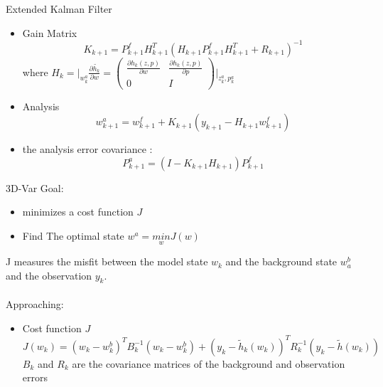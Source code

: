 \documentclass{beamer}
\begin{document}
\begin{frame}{Extended Kalman Filter}
    \begin{itemize}
        \item Gain Matrix 
        \begin{equation}
        K_{k+1} = P_{k+1}^f H_{k+1}^T (H_{k+1} P_{k+1}^f H_{k+1}^T + R_{k+1}) ^{-1}
        \end{equation}
        where  $H_k = \big|_{w_k^a} \frac{\partial \tilde{h_k} }{ \partial w } = 
        \begin{pmatrix}
        \frac{\partial h_k(z,p)}{\partial w } & \frac{\partial h_k(z,p)}{ \partial p}\\
        0 & I 
        \end{pmatrix}  \big|_{{z_k^a},{ p_k^a}}$
        
        \item Analysis
        \begin{equation}
        w_{k+1}^a = w_{k+1}^f + K_{k+1} (y_{k+1} - H_{k+1} w_{k+1}^f)
        \end{equation}


        \item the analysis error covariance :
        \begin{equation}
            P_{k+1}^a = (I - K_{k+1} H_{k+1} ) P_{k+1}^f
        \end{equation}
    \end{itemize}
\end{frame}
\begin{frame}{3D-Var}
Goal:  
\begin{itemize}
    \item minimizes a cost function $J$  
    \item Find The optimal state $w^a = \underset{w} {min} J(w)$ 
\end{itemize}
    J measures the misfit between the model state $w_k$ and the background state $w_a^b$ and the observation $y_k$. \\ 
~~\\
    
Approaching: 
\begin{itemize}
        \item Cost function $J$
        \begin{equation}
        J(w_k) = (w_k - w_k^b)^T B_k^{-1} (w_k - w_k^b) + (y_k - \tilde h_k (w_k)) ^T R_k^{-1} (y_k - \tilde h (w_k)) 
        \label{costFunc}
        \end{equation}
        $B_k$ and $R_k$ are the covariance matrices of the background and observation errors
\end{itemize}

\end{frame}
\end{document}
